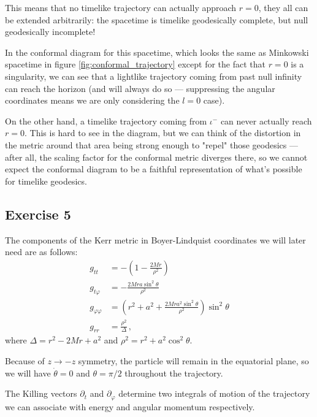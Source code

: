 \documentclass[main.tex]{subfiles}
\begin{document}
This means that no timelike trajectory can actually approach \(r = 0\), they all can be extended arbitrarily: the spacetime is timelike geodesically complete, but null geodesically incomplete! 

In the conformal diagram for this spacetime, which looks the same as Minkowski spacetime in figure \ref{fig:conformal_trajectory} except for the fact that \(r = 0\) is a singularity, we can see that a lightlike trajectory coming from past null infinity can reach the horizon (and will always do so --- suppressing the angular coordinates means we are only considering the \(l = 0\) case).

On the other hand, a timelike trajectory coming from \(\iota^-\) can never actually reach \(r = 0\). 
This is hard to see in the diagram, but we can think of the distortion in the metric around that area being strong enough to "repel" those geodesics --- after all, the scaling factor for the conformal metric diverges there, so we cannot expect the conformal diagram to be a faithful representation of what's possible for timelike geodesics.

\subsection{Exercise 5}

The components of the Kerr metric in Boyer-Lindquist coordinates we will later need are as follows: 
%
\begin{align}
g_{tt} &= - \left(1 - \frac{2Mr}{\rho^2}\right)  \\
g_{t \varphi } &= - \frac{2 M r a \sin^2 \theta }{\rho^2}  \\
g_{\varphi \varphi } &=  \left( r^2 + a^2 + \frac{2 M r a^2 \sin^2 \theta }{\rho^2} \right) \sin^2 \theta  \\
g_{rr} &= \frac{\rho^2}{\Delta }
\,,
\end{align}
%
where \(\Delta = r^2 - 2Mr + a^2\) and \(\rho^2 = r^2 + a^2 \cos^2 \theta \).

Because of \(z \to -z\) symmetry, the particle will remain in the equatorial plane, so we will have \(\dot{\theta} = 0\) and \(\theta = \pi /2\) throughout the 
trajectory.

The Killing vectors \(\partial_t\) and \(\partial_\varphi \) determine two integrals of motion of the trajectory we can associate with energy and angular momentum respectively. 
\end{document}
